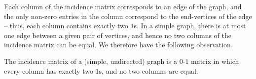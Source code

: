Each column of the incidence matrix corresponds to an edge of the graph, and the only non-zero entries in the column correspond to the end-vertices of the edge -- thus, each column contains exactly two $1$s. In a simple graph, there is at most one edge between a given pair of vertices, and hence no two columns of the incidence matrix can be equal. We therefore have the following observation.

\begin{Observation}
The incidence matrix of a (simple, undirected) graph is a $0$-$1$ matrix in which every column has exactly two $1$s, and no two columns are equal.
\end{Observation}

%

